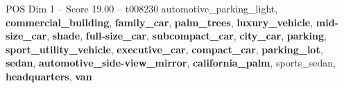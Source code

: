 \begin{textsample}{POS Dim 1 – Score 19.00 – t008230}  \label{ex:f1_pos_025}
automotive\_parking\_light, \textbf{commercial\_building}, \textbf{family\_car}, \textbf{palm\_trees}, \textbf{luxury\_vehicle}, \textbf{mid-size\_car}, \textbf{shade}, \textbf{full-size\_car}, \textbf{subcompact\_car}, \textbf{city\_car}, \textbf{parking}, \textbf{sport\_utility\_vehicle}, \textbf{executive\_car}, \textbf{compact\_car}, \textbf{parking\_lot}, \textbf{sedan}, \textbf{automotive\_side-view\_mirror}, \textbf{california\_palm}, sports\_sedan, \textbf{headquarters}, \textbf{van}

\end{textsample}
